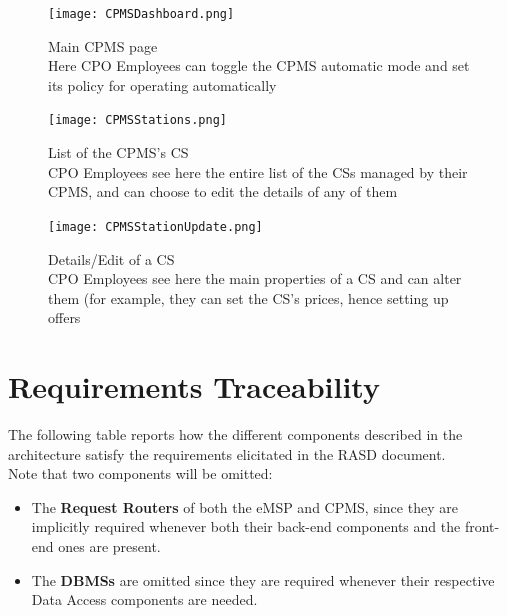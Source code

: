\documentclass[11pt]{article}
\begin{document}
\begin{figure}[!ht]
    \centering
    \texttt{[image: CPMSDashboard.png]}
    \captionsetup{justification=centering,margin=2cm}
    \caption{Main CPMS page \\
    Here CPO Employees can toggle the CPMS automatic mode and set its policy for operating automatically}
    \label{fig:my_label}
\end{figure}

\newpage

\begin{figure}[!ht]
    \centering
    \texttt{[image: CPMSStations.png]}
    \captionsetup{justification=centering,margin=2cm}
    \caption{List of the CPMS's CS \\
    CPO Employees see here the entire list of the CSs managed by their CPMS, and can choose to edit the details of any of them}
    \label{fig:my_label}
\end{figure}

\begin{figure}[!ht]
    \centering
    \texttt{[image: CPMSStationUpdate.png]}
    \captionsetup{justification=centering,margin=2cm}
    \caption{Details/Edit of a CS \\
    CPO Employees see here the main properties of a CS and can alter them (for example, they can set the CS's prices, hence setting up offers}
    \label{fig:my_label}
\end{figure}

\newpage

\section{Requirements Traceability}

The following table reports how the different components described in the architecture satisfy the requirements elicitated in the RASD document. \\
Note that two components will be omitted:

\begin{itemize}
    \item The \textbf{Request Routers} of both the eMSP and CPMS, since they are implicitly required whenever both their back-end components and the front-end ones are present.
    \item The \textbf{DBMSs} are omitted since they are required whenever their respective Data Access components are needed.
\end{itemize}
\end{document}
